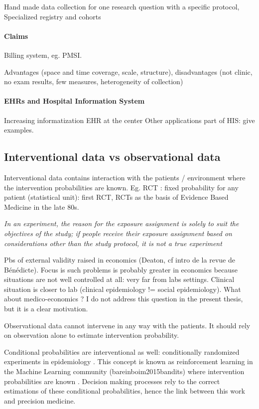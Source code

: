 \documentclass{report}
\begin{document}
Hand made data collection for one research question with a specific protocol,
Specialized registry and cohorts


\paragraph{Claims}

Billing system, eg. PMSI.

Advantages (space and time coverage, scale, structure), disadvantages (not clinic, no exam results, few measures, heterogeneity of collection)

\paragraph{EHRs and Hospital Information System}

Increasing informatization
EHR at the center
Other applications part of HIS: give examples.

\subsection{Interventional data vs observational
  data}\label{subsec:intro:interventional_vs_observational}


Interventional data contains interaction with the patients / environment where
the intervention probabilities are known. Eg. RCT : fixed probability for any
patient (statistical unit): first RCT, RCTs as the basis of Evidence Based
Medicine in the late 80s.

\textit{In an experiment, the reason for the exposure assignment is solely to
  suit the objectives of the study; if people receive their exposure assignment
  based on considerations other than the study protocol, it is not a true
  experiment} \citep{rothman2012epidemiology}

Pbs of external validity raised in economics (Deaton, cf intro de la revue de
Bénédicte). Focus is such problems is probably greater in economics because
situations are not well controlled at all: very far from labs settings. Clinical
situation is closer to lab (clinical epidemiology != social epidemiology). What
about medico-economics ? I do not address this question in the present thesis,
but it is a clear motivation.

%
Observational data cannot intervene in any way with the patients. It should rely
on observation alone to estimate intervention probability.

Conditional probabilities are interventional as well: conditionally randomized
experiments in epidemiology \citep{hernan2020causal}. This concept is known as
reinforcement learning in the Machine Learning community (bareinboim2015bandits)
where intervention probabilities are known \cite{bareinboim2015bandits}.
Decision making processes rely to the correct estimations of these
conditional probabilities, hence the link between this work and precision medicine.
\end{document}
